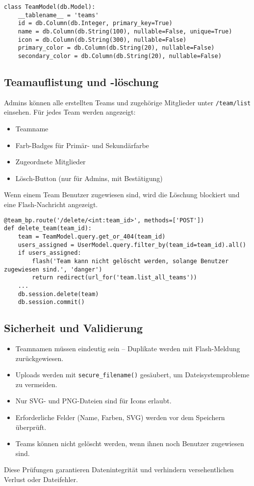 \documentclass[12pt]{article}
\begin{document}
\begin{verbatim}
class TeamModel(db.Model):
    __tablename__ = 'teams'
    id = db.Column(db.Integer, primary_key=True)
    name = db.Column(db.String(100), nullable=False, unique=True)
    icon = db.Column(db.String(300), nullable=False)
    primary_color = db.Column(db.String(20), nullable=False)
    secondary_color = db.Column(db.String(20), nullable=False)
\end{verbatim}

\subsection{Teamauflistung und -löschung}

Admins können alle erstellten Teams und zugehörige Mitglieder unter \texttt{/team/list} einsehen. Für jedes Team werden angezeigt:

\begin{itemize}
    \item Teamname
    \item Farb-Badges für Primär- und Sekundärfarbe
    \item Zugeordnete Mitglieder
    \item Lösch-Button (nur für Admins, mit Bestätigung)
\end{itemize}

\noindent Wenn einem Team Benutzer zugewiesen sind, wird die Löschung blockiert und eine Flash-Nachricht angezeigt.

\begin{verbatim}
@team_bp.route('/delete/<int:team_id>', methods=['POST'])
def delete_team(team_id):
    team = TeamModel.query.get_or_404(team_id)
    users_assigned = UserModel.query.filter_by(team_id=team_id).all()
    if users_assigned:
        flash('Team kann nicht gelöscht werden, solange Benutzer zugewiesen sind.', 'danger')
        return redirect(url_for('team.list_all_teams'))
    ...
    db.session.delete(team)
    db.session.commit()
\end{verbatim}

\subsection{Sicherheit und Validierung}

\begin{itemize}
    \item Teamnamen müssen eindeutig sein – Duplikate werden mit Flash-Meldung zurückgewiesen.
    \item Uploads werden mit \texttt{secure\_filename()} gesäubert, um Dateisystemprobleme zu vermeiden.
    \item Nur SVG- und PNG-Dateien sind für Icons erlaubt.
    \item Erforderliche Felder (Name, Farben, SVG) werden vor dem Speichern überprüft.
    \item Teams können nicht gelöscht werden, wenn ihnen noch Benutzer zugewiesen sind.
\end{itemize}

\noindent Diese Prüfungen garantieren Datenintegrität und verhindern versehentlichen Verlust oder Dateifehler.
\end{document}
